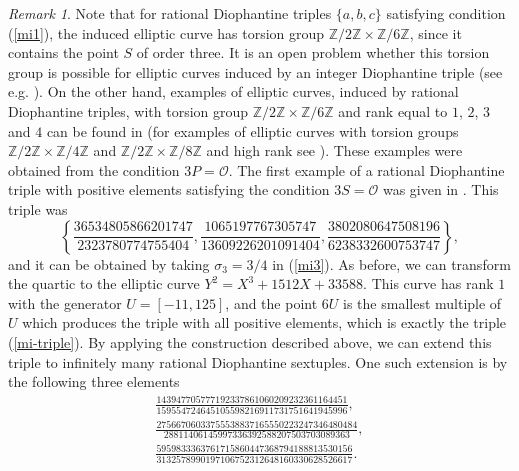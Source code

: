 \documentclass[11pt]{amsart}
\theoremstyle{plain}
\theoremstyle{remark}
\newtheorem{remark}{Remark}
\begin{document}
\begin{remark}
\label{rmz2z6}
Note that for rational Diophantine triples $\{a,b,c\}$ satisfying condition (\ref{mi1}), the induced elliptic curve has torsion group  $\mathbb{Z}/2\mathbb{Z} \times \mathbb{Z}/6\mathbb{Z}$, since it contains the point $S$ of order three. It is an open problem whether this torsion group is possible for elliptic curves induced by an integer Diophantine triple (see e.g. \cite{D-M,Mi}). On the other hand, examples of elliptic curves, induced by rational Diophantine triples, with torsion group $\mathbb{Z}/2\mathbb{Z} \times \mathbb{Z}/6\mathbb{Z}$ and rank equal to $1$, $2$, $3$ and $4$ can be found in \cite{D-mw} (for examples of elliptic curves with torsion groups $\mathbb{Z}/2\mathbb{Z} \times \mathbb{Z}/4\mathbb{Z}$ and $\mathbb{Z}/2\mathbb{Z} \times \mathbb{Z}/8\mathbb{Z}$ and high rank see \cite{D-P,D-mw}). These examples were obtained from the condition $3P=\mathcal{O}$. The first example of a rational Diophantine triple with positive elements satisfying the condition $3S=\mathcal{O}$ was given in \cite{M-thesis}. This triple was
\begin{equation}
\label{mi-triple}
\left\{ \frac{36534805866201747}{2323780774755404},
\frac{1065197767305747}{13609226201091404},
\frac{3802080647508196}{6238332600753747} \right\},
\end{equation}
and it can be obtained by taking $\sigma_3=3/4$ in (\ref{mi3}). As before, we can transform the quartic to the elliptic curve $Y^2 = X^3+1512X+33588$. This curve has rank $1$ with the generator $U=[-11, 125]$, and the point $6U$ is the smallest multiple of $U$ which produces the triple with all positive elements, which is exactly the triple (\ref{mi-triple}). By applying the construction described above, we can extend this triple to infinitely many rational Diophantine sextuples. One such extension is by the following three elements
\begin{eqnarray*}
\frac{143947705777192337861060209232361164451}{159554724645105598216911731751641945996}, \\[8pt]
\frac{27566706033755538837165550223247346480484}{28811406145997336392588207503703089363}, \\[8pt]
\frac{5959833363761715860447368794188813530156}{3132578990197106752312648160330628526617}.
\end{eqnarray*}
\end{remark}
\end{document}
